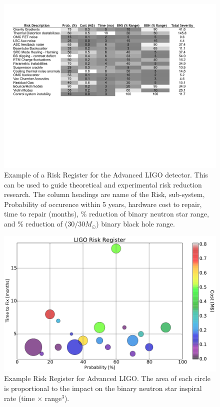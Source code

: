 %
\begin{figure}[h]
  \centering
\includegraphics[width=\columnwidth]{Figures/RiskRegister.pdf}
  \caption{Example of a Risk Register for the Advanced LIGO detector. This can be used
  to guide theoretical and experimental risk reduction research. The column headings are
  name of the Risk, sub-system, Probability of occurence within 5 years, hardware
  cost to repair, time to repair (months), \% reduction of binary neutron star range,
  and \% reduction of ($30/30 M_{\odot}$) binary black hole range.}
  \label{t:IDC:Risk}
\end{figure}

\begin{figure}[h]
  \centering
\includegraphics[width=\columnwidth]{Figures/Risk.pdf}
  \caption{Example Risk Register for Advanced LIGO. The area of each circle is
  proportional to the impact on the binary neutron star inspiral rate
  (time $\times$ range$^3$).}
  \label{fig:RiskBubbles}
\end{figure}


